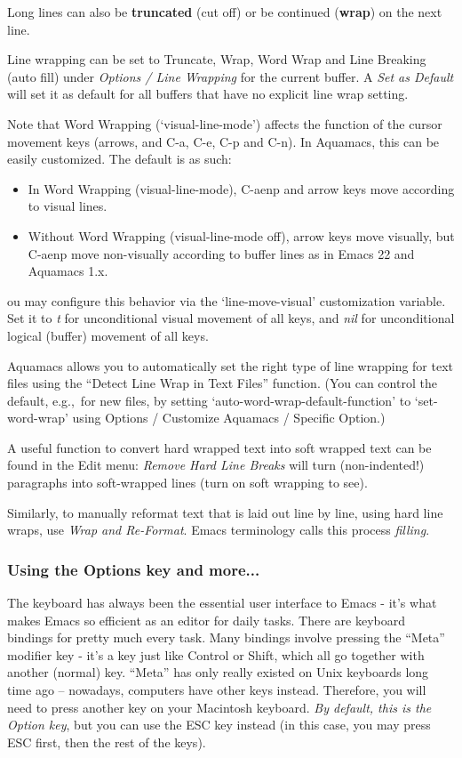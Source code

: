\documentclass[11pt,letterpaper]{article}
\begin{document}
Long lines can also be \textbf{truncated} (cut off) or be continued (\textbf{wrap}) on the next line.

Line wrapping can be set to Truncate, Wrap, Word Wrap and Line Breaking (auto fill) under \emph{Options / Line Wrapping} for the current buffer.  A \emph{Set as Default} will set it as default for all buffers that have no explicit line wrap setting.  

Note that Word Wrapping (`visual-line-mode') affects the function of the cursor movement keys (arrows, and C-a, C-e, C-p and C-n).  In Aquamacs, this can be easily customized.  The default is as such:  
\begin{itemize}
\item In Word Wrapping (visual-line-mode), C-aenp and arrow keys move according to visual lines.
\item Without Word Wrapping (visual-line-mode off), arrow keys move visually, but C-aenp move non-visually according to buffer lines as in Emacs 22 and Aquamacs 1.x.
\end{itemize}
ou may configure this behavior via the `line-move-visual' customization variable.  Set it to \emph{t} for unconditional visual movement of all keys, and \emph{nil} for unconditional logical (buffer) movement of all keys.

Aquamacs allows you to automatically set the right type of line wrapping for text files using the ``Detect Line Wrap in Text Files'' function.  (You can control the default, e.g.,~for new files, by setting `auto-word-wrap-default-function' to `set-word-wrap' using Options / Customize Aquamacs / Specific Option.)
 
A useful function to convert hard wrapped text into soft wrapped text can be found in the Edit menu: \emph{Remove Hard Line Breaks} will turn (non-indented!) paragraphs into soft-wrapped lines (turn on soft wrapping to see). 

Similarly, to manually reformat text that is laid out line by line, using hard line wraps, use \emph{Wrap and Re-Format}.  Emacs terminology calls this process \emph{filling}.


\subsubsection{Using the Options key and more...}

The keyboard has always been the essential user interface to Emacs -
it's what makes Emacs so efficient as an editor for daily
tasks. There are keyboard bindings for pretty much every task. Many
bindings involve pressing the ``Meta'' modifier key - it's a key just
like Control or Shift, which all go together with another (normal)
key. ``Meta'' has only really existed on Unix keyboards long time ago
-- nowadays, computers have other keys instead. Therefore, you will
need to press another key on your Macintosh keyboard. \emph{By default, this
is the Option key}, but you can use the ESC key instead (in this case,
you may press ESC first, then the rest of the keys).
\end{document}
